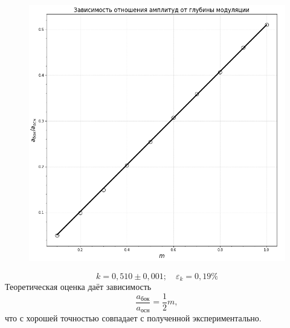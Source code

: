\documentclass[a4paper,12pt]{article}
\begin{document}
\newpage
\begin{figure}[H]\label{fig: a_b div a_o (m)}
    \centering
    \includegraphics[width = \textwidth]{a_b div a_o (m).png}
\end{figure}
\[k = 0,510 \pm 0,001; \quad \varepsilon_k = 0,19\%\]
Теоретическая оценка даёт зависимость
\[\frac{a_{бок}}{a_{осн}} = \frac{1}{2} m,\]
что с хорошей точностью совпадает с полученной экспериментально.


\end{document}
